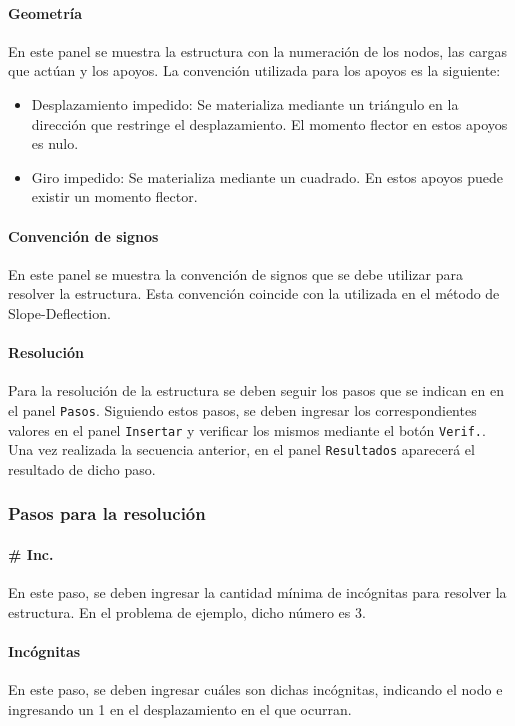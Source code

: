 \paragraph{Geometría}
En este panel se muestra la estructura con la numeración de los nodos, las cargas que actúan y los apoyos. La convención utilizada para los apoyos es la siguiente:
\begin{itemize}
	\item Desplazamiento impedido: Se materializa mediante un triángulo en la dirección que restringe el desplazamiento. El momento flector en estos apoyos es nulo.
	\item Giro impedido: Se materializa mediante un cuadrado. En estos apoyos puede existir un momento flector.  
\end{itemize}

\paragraph{Convención de signos}
En este panel se muestra la convención de signos que se debe utilizar para resolver la estructura. Esta convención coincide con la utilizada en el método de Slope-Deflection.

\paragraph{Resolución}
Para la resolución de la estructura se deben seguir los pasos que se indican en en el panel \verb|Pasos|. Siguiendo estos pasos, se deben ingresar los correspondientes valores en el panel \verb|Insertar| y verificar los mismos mediante el botón \verb|Verif.|. Una vez realizada la secuencia anterior, en el panel \verb|Resultados| aparecerá el resultado de dicho paso.

\subsubsection{Pasos para la resolución}

\paragraph{\# Inc.}
En este paso, se deben ingresar la cantidad mínima de incógnitas para resolver la estructura. En el problema de ejemplo, dicho número es 3.

\paragraph{Incógnitas}
En este paso, se deben ingresar cuáles son dichas incógnitas, indicando el nodo e ingresando un 1 en el desplazamiento en el que ocurran.
